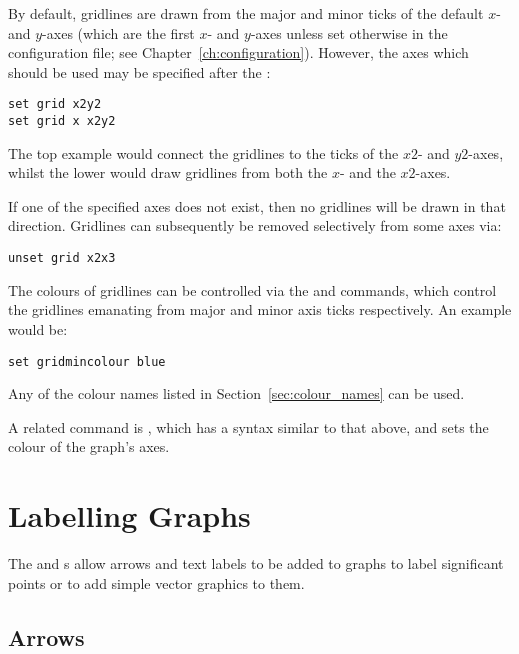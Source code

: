 \noindent By default, gridlines are drawn from the major and minor ticks of the
default $x$- and $y$-axes (which are the first $x$- and $y$-axes unless set
otherwise in the configuration file; see Chapter~\ref{ch:configuration}).
However, the axes which should be used may be specified after the :

\begin{verbatim}
set grid x2y2
set grid x x2y2
\end{verbatim}

\noindent The top example would connect the gridlines to the ticks of the $x2$-
and $y2$-axes, whilst the lower would draw gridlines from both the $x$- and the
$x2$-axes.

If one of the specified axes does not exist, then no gridlines will be drawn in
that direction.  Gridlines can subsequently be removed selectively from some
axes via:

\begin{verbatim}
unset grid x2x3
\end{verbatim}

The colours of gridlines can be
controlled via the  and  commands, which control the gridlines emanating from major and
minor axis ticks respectively. An example would be:

\begin{verbatim}
set gridmincolour blue
\end{verbatim}

\noindent Any of the colour names listed in Section~\ref{sec:colour_names} can
be used.

A related command is , which has a syntax similar to that above, and sets the colour of
the graph's axes.\label{sec:set_colours}

\section{Labelling Graphs}

The  and s allow arrows and text labels
to be added to graphs to label significant points or to add simple vector
graphics to them.

\subsection{Arrows}

